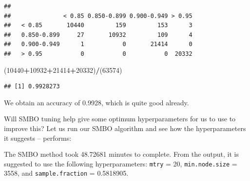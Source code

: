 \documentclass[12pt]{article}
\newenvironment{Shaded}{\begin{snugshade}}{\end{snugshade}}
\newcommand{\DataTypeTok}[1]{\textcolor[rgb]{0.13,0.29,0.53}{#1}}
\newcommand{\DecValTok}[1]{\textcolor[rgb]{0.00,0.00,0.81}{#1}}
\newcommand{\FloatTok}[1]{\textcolor[rgb]{0.00,0.00,0.81}{#1}}
\newcommand{\KeywordTok}[1]{\textcolor[rgb]{0.13,0.29,0.53}{\textbf{#1}}}
\newcommand{\NormalTok}[1]{#1}
\newcommand{\OperatorTok}[1]{\textcolor[rgb]{0.81,0.36,0.00}{\textbf{#1}}}
\newcommand{\StringTok}[1]{\textcolor[rgb]{0.31,0.60,0.02}{#1}}
\begin{document}
\begin{Shaded}
\end{Shaded}

\begin{verbatim}
##              
##               < 0.85 0.850-0.899 0.900-0.949 > 0.95
##   < 0.85       10440         159         153      3
##   0.850-0.899     27       10932         109      4
##   0.900-0.949      1           0       21414      0
##   > 0.95           0           0           0  20332
\end{verbatim}

\begin{Shaded}
\begin{Highlighting}[]
\NormalTok{(}\DecValTok{10440}\OperatorTok{+}\DecValTok{10932}\OperatorTok{+}\DecValTok{21414}\OperatorTok{+}\DecValTok{20332}\NormalTok{)}\OperatorTok{/}\NormalTok{(}\DecValTok{63574}\NormalTok{)}
\end{Highlighting}
\end{Shaded}

\begin{verbatim}
## [1] 0.9928273
\end{verbatim}

We obtain an accuracy of 0.9928, which is quite good already.

\newpage

Will SMBO tuning help give some optimum hyperparameters for us to use to
improve this? Let us run our SMBO algorithm and see how the
hyperparameters it suggests -- performs:

The SMBO method took 48.72681 minutes to complete. From the output, it
is suggested to use the following hyperparameters: \texttt{mtry} = 20,
\texttt{min.node.size} = 3558, and \texttt{sample.fraction} = 0.5818905.
\end{document}

